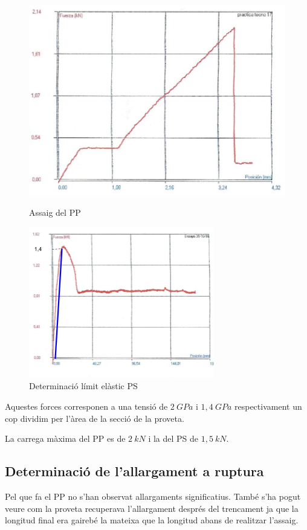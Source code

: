 \documentclass[a4paper]{report}
\begin{document}
\begin{figure}[H]
	\centering
	\begin{minipage}{0.49\textwidth}
		\centering
		\includegraphics[height=0.6\textwidth]{images/traccio/polimeric-PP}
		\caption{Assaig del PP}
		\label{fig:traccio-polimeric-PP}
	\end{minipage}
	\begin{minipage}{0.49\textwidth}
		\centering
		\includegraphics[height=0.6\textwidth]{images/traccio/polimeric-PS}
		\caption{Determinació límit elàstic PS}
		\label{fig:traccio-polimeric-PS}
\end{minipage}
\end{figure}

Aquestes forces corresponen a una tensió de $2\ GPa$ i $1,4\ GPa$ respectivament un cop dividim per l’àrea de la secció de la proveta.

La carrega màxima del PP es de $2\ kN$ i la del PS de $1,5\ kN$.

\subsection{Determinació de l'allargament a ruptura}
Pel que fa el PP no s’han observat allargaments significatius. També s'ha pogut veure com la proveta recuperava l'allargament després del trencament ja que la longitud final era gairebé la mateixa que la longitud abans de realitzar l'assaig.
\end{document}
